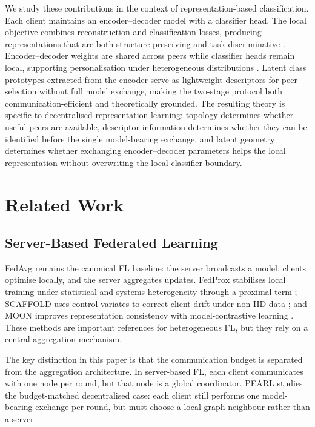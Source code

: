 \documentclass[conference]{IEEEtran}
\begin{document}
We study these contributions in the context of representation-based classification. Each client maintains an encoder--decoder model with a classifier head. The local objective combines reconstruction and classification losses, producing representations that are both structure-preserving and task-discriminative \cite{le2018supervised,chen2023auto}. Encoder--decoder weights are shared across peers while classifier heads remain local, supporting personalisation under heterogeneous distributions \cite{collins2021exploiting}. Latent class prototypes extracted from the encoder serve as lightweight descriptors for peer selection without full model exchange, making the two-stage protocol both communication-efficient and theoretically grounded. The resulting theory is specific to decentralised representation learning: topology determines whether useful peers are available, descriptor information determines whether they can be identified before the single model-bearing exchange, and latent geometry determines whether exchanging encoder--decoder parameters helps the local representation without overwriting the local classifier boundary.

\section{Related Work}
\label{sec:related-work}

\subsection{Server-Based Federated Learning}
\label{subsec:server-based-federated-learning}
FedAvg \cite{mcmahan2017communication} remains the canonical FL baseline: the server broadcasts a model, clients optimise locally, and the server aggregates updates. FedProx stabilises local training under statistical and systems heterogeneity through a proximal term \cite{li2020fedprox}; SCAFFOLD uses control variates to correct client drift under non-IID data \cite{karimireddy2020scaffold}; and MOON improves representation consistency with model-contrastive learning \cite{li2021moon}. These methods are important references for heterogeneous FL, but they rely on a central aggregation mechanism.

The key distinction in this paper is that the communication budget is separated from the aggregation architecture. In server-based FL, each client communicates with one node per round, but that node is a global coordinator. PEARL studies the budget-matched decentralised case: each client still performs one model-bearing exchange per round, but must choose a local graph neighbour rather than a server.
\end{document}
